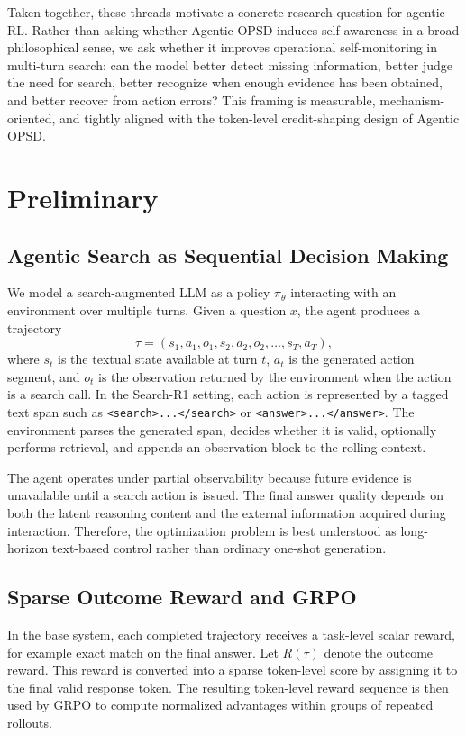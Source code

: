 \documentclass[11pt]{article}
\newcommand{\method}{Agentic OPSD}
\newcommand{\grpo}{GRPO}
\newcommand{\searchr}{Search-R1}
\begin{document}
Taken together, these threads motivate a concrete research question for agentic RL. Rather than asking whether Agentic OPSD induces self-awareness in a broad philosophical sense, we ask whether it improves operational self-monitoring in multi-turn search: can the model better detect missing information, better judge the need for search, better recognize when enough evidence has been obtained, and better recover from action errors? This framing is measurable, mechanism-oriented, and tightly aligned with the token-level credit-shaping design of \method{}.

\section{Preliminary}
\subsection{Agentic Search as Sequential Decision Making}
We model a search-augmented LLM as a policy $\pi_{\theta}$ interacting with an environment over multiple turns. Given a question $x$, the agent produces a trajectory
\begin{equation}
\tau = (s_1, a_1, o_1, s_2, a_2, o_2, \dots, s_T, a_T),
\end{equation}
where $s_t$ is the textual state available at turn $t$, $a_t$ is the generated action segment, and $o_t$ is the observation returned by the environment when the action is a search call. In the \searchr{} setting, each action is represented by a tagged text span such as \texttt{<search>...</search>} or \texttt{<answer>...</answer>}. The environment parses the generated span, decides whether it is valid, optionally performs retrieval, and appends an observation block to the rolling context.

The agent operates under partial observability because future evidence is unavailable until a search action is issued. The final answer quality depends on both the latent reasoning content and the external information acquired during interaction. Therefore, the optimization problem is best understood as long-horizon text-based control rather than ordinary one-shot generation.

\subsection{Sparse Outcome Reward and \grpo{}}
In the base system, each completed trajectory receives a task-level scalar reward, for example exact match on the final answer. Let $R(\tau)$ denote the outcome reward. This reward is converted into a sparse token-level score by assigning it to the final valid response token. The resulting token-level reward sequence is then used by \grpo{} to compute normalized advantages within groups of repeated rollouts.
\end{document}
